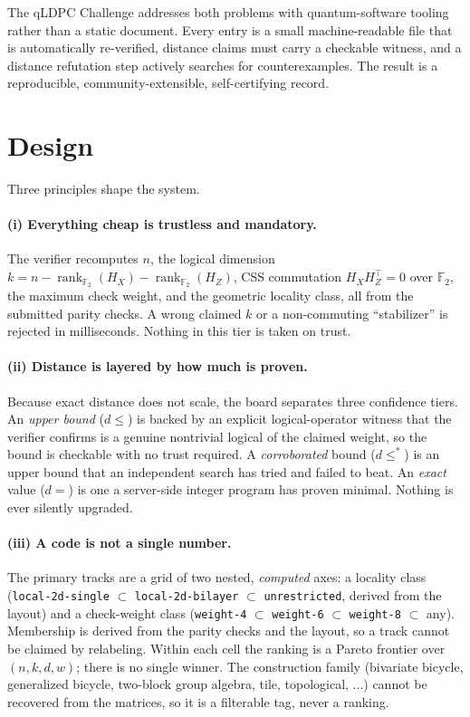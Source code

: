 \documentclass[11pt]{article}
\newcommand{\GF}{\mathbb{F}_2}
\newcommand{\rank}{\operatorname{rank}}
\begin{document}
The qLDPC Challenge addresses both problems with quantum-software tooling rather
than a static document. Every entry is a small machine-readable file that is
automatically re-verified, distance claims must carry a checkable witness, and a
distance refutation step actively searches for counterexamples. The result is a
reproducible, community-extensible, self-certifying record.

\section{Design}

Three principles shape the system.

\paragraph{(i) Everything cheap is trustless and mandatory.} The verifier
recomputes $n$, the logical dimension
$k = n - \rank_{\GF}(H_X) - \rank_{\GF}(H_Z)$, CSS commutation
$H_X H_Z^{\top} = 0$ over $\GF$, the maximum check weight, and the geometric
locality class, all from the submitted parity checks. A wrong claimed $k$ or a
non-commuting ``stabilizer'' is rejected in milliseconds. Nothing in this tier is
taken on trust.

\paragraph{(ii) Distance is layered by how much is proven.} Because exact
distance does not scale, the board separates three confidence tiers. An
\emph{upper bound} ($d \le$) is backed by an explicit logical-operator witness
that the verifier confirms is a genuine nontrivial logical of the claimed weight,
so the bound is checkable with no trust required. A \emph{corroborated} bound
($d \le^{\!*}$) is an upper bound that an independent search has tried and failed
to beat. An \emph{exact} value ($d =$) is one a server-side integer program has
proven minimal. Nothing is ever silently upgraded.

\paragraph{(iii) A code is not a single number.} The primary tracks are a grid
of two nested, \emph{computed} axes: a locality class
(\texttt{local-2d-single} $\subset$ \texttt{local-2d-bilayer} $\subset$
\texttt{unrestricted}, derived from the layout) and a check-weight class
(\texttt{weight-4} $\subset$ \texttt{weight-6} $\subset$ \texttt{weight-8}
$\subset$ any). Membership is derived from the parity checks and the layout, so a
track cannot be claimed by relabeling. Within each cell the ranking is a Pareto
frontier over $(n,k,d,w)$; there is no single winner. The construction family
(bivariate bicycle, generalized bicycle, two-block group algebra, tile,
topological, ...) cannot be recovered from the matrices, so it is a filterable
tag, never a ranking.
\end{document}
